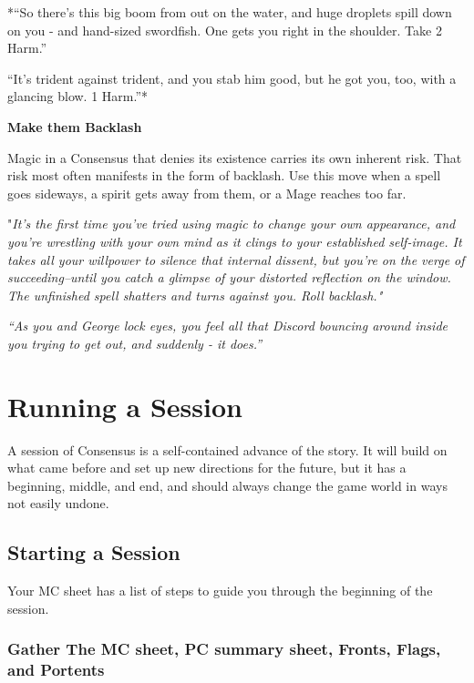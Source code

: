 \documentclass[
  oneside,
  statementpaper,
  9pt]{memoir}
\begin{document}
*``So there's this big boom from out on the water, and huge droplets
spill down on you - and hand-sized swordfish. One gets you right in the
shoulder. Take 2 Harm.''

``It's trident against trident, and you stab him good, but he got you,
too, with a glancing blow. 1 Harm.''*

\textbf{Make them Backlash}

Magic in a Consensus that denies its existence carries its own inherent
risk. That risk most often manifests in the form of backlash. Use this
move when a spell goes sideways, a spirit gets away from them, or a Mage
reaches too far.

"\emph{It's the first time you've tried using magic to change your own
appearance, and you're wrestling with your own mind as it clings to your
established self-image. It takes all your willpower to silence that
internal dissent, but you're on the verge of succeeding--until you catch
a glimpse of your distorted reflection on the window. The unfinished
spell shatters and turns against you. Roll backlash."}

\emph{``As you and George lock eyes, you feel all that Discord bouncing
around inside you trying to get out, and suddenly - it does.''}

\hypertarget{running-a-session}{%
\section{Running a Session}\label{running-a-session}}

A session of Consensus is a self-contained advance of the story. It will
build on what came before and set up new directions for the future, but
it has a beginning, middle, and end, and should always change the game
world in ways not easily undone.

\hypertarget{starting-a-session}{%
\subsection{Starting a Session}\label{starting-a-session}}

Your MC sheet has a list of steps to guide you through the beginning of
the session.

\hypertarget{gather-the-mc-sheet-pc-summary-sheet-fronts-flags-and-portents}{%
\subsubsection{Gather The MC sheet, PC summary sheet, Fronts, Flags, and
Portents}\label{gather-the-mc-sheet-pc-summary-sheet-fronts-flags-and-portents}}
\end{document}
